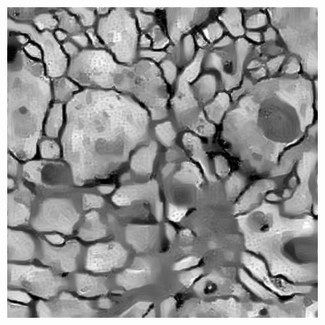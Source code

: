 \documentclass[12pt, a4paper]{scrartcl}
\begin{document}
\begin{figure}[H]
\begin{subfigure}{.28\textwidth}
  \label{fig:nas32}
\end{subfigure}
\begin{subfigure}{.34\textwidth}
  \centering
  \includegraphics[width=.9\linewidth]{stylized-train0-style3-150}

  \label{fig:nas33}
\end{subfigure}
\label{fig:neuron_art_style3}
\end{figure}
\end{document}

